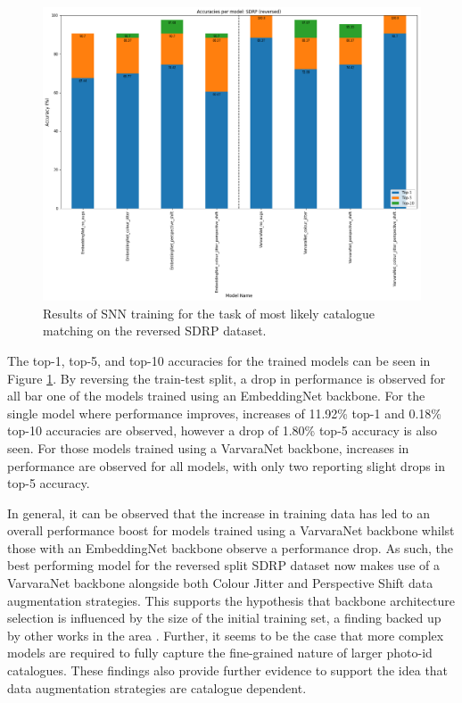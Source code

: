  \begin{figure}[t]
 	\begin{center}
 		\includegraphics[scale=0.4]{Chapter6/figs/SDRP-reversed-split-model-comparison.png}
 	\end{center}
 	\caption{Results of SNN training for the task of most likely catalogue matching on the reversed SDRP dataset.}
 	\label{fig:SDRP-reversed-split-model-comparison}
 \end{figure}

The top-1, top-5, and top-10 accuracies for the trained models can be seen in Figure \ref{fig:SDRP-reversed-split-model-comparison}. By reversing the train-test split, a drop in performance is observed for all bar one of the models trained using an EmbeddingNet backbone. For the single model where performance improves, increases of 11.92\% top-1 and 0.18\%  top-10 accuracies are observed, however a drop of 1.80\% top-5 accuracy is also seen. For those models trained using a VarvaraNet backbone, increases in performance are observed for all models, with only two reporting slight drops in top-5 accuracy. 

In general, it can be observed that the increase in training data has led to an overall performance boost for models trained using a VarvaraNet backbone whilst those with an EmbeddingNet backbone observe a performance drop. As such, the best performing model for the reversed split SDRP dataset now makes use of a VarvaraNet backbone alongside both Colour Jitter and Perspective Shift data augmentation strategies. This supports the hypothesis that backbone architecture selection is influenced by the size of the initial training set, a finding backed up by other works in the area \cite{dutta_evaluation_2018, sug_effect_2010}. Further, it seems to be the case that more complex models are required to fully capture the fine-grained nature of larger photo-id catalogues. These findings also provide further evidence to support the idea that data augmentation strategies are catalogue dependent. 

